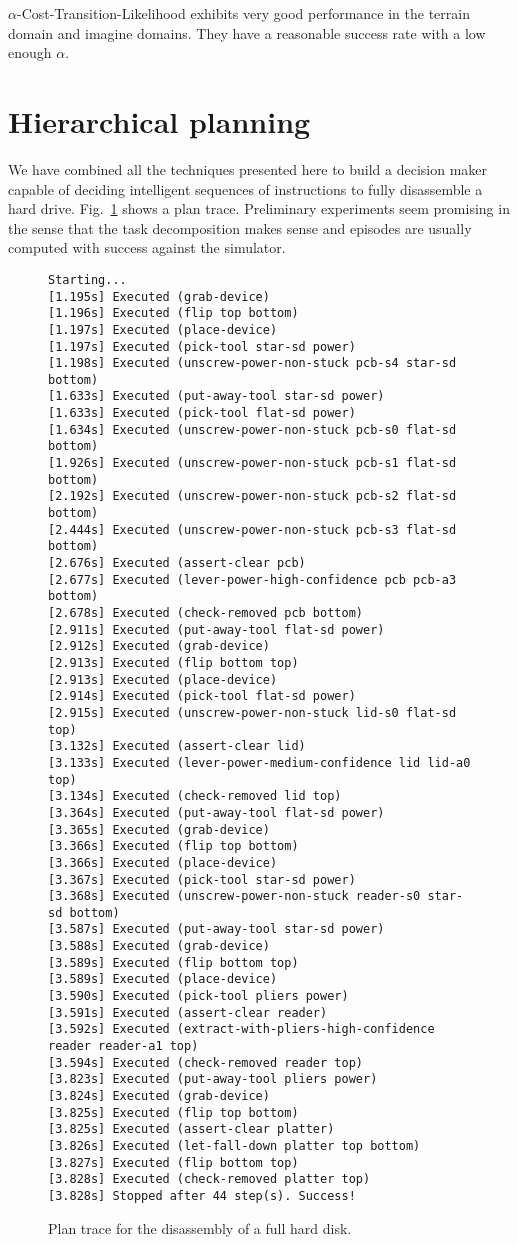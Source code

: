 \documentclass[../root.tex]{subfiles}
\begin{document}
$ \alpha $-Cost-Transition-Likelihood exhibits very good performance in the terrain domain
and imagine domains. They have a reasonable success rate with a low enough $ \alpha $.


\section{Hierarchical planning}

We have combined all the techniques presented here to build a decision
maker capable of deciding intelligent sequences of instructions to
fully disassemble a hard drive. Fig.~\ref{fig:full-drive-disassembly}
shows a plan trace. Preliminary experiments seem promising in the sense that
the task decomposition makes sense and episodes are usually computed with success
against the simulator.

\begin{figure}[tbhp]
\centering
\begin{lstlisting}[numbers=none]
Starting...
[1.195s] Executed (grab-device)
[1.196s] Executed (flip top bottom)
[1.197s] Executed (place-device)
[1.197s] Executed (pick-tool star-sd power)
[1.198s] Executed (unscrew-power-non-stuck pcb-s4 star-sd bottom)
[1.633s] Executed (put-away-tool star-sd power)
[1.633s] Executed (pick-tool flat-sd power)
[1.634s] Executed (unscrew-power-non-stuck pcb-s0 flat-sd bottom)
[1.926s] Executed (unscrew-power-non-stuck pcb-s1 flat-sd bottom)
[2.192s] Executed (unscrew-power-non-stuck pcb-s2 flat-sd bottom)
[2.444s] Executed (unscrew-power-non-stuck pcb-s3 flat-sd bottom)
[2.676s] Executed (assert-clear pcb)
[2.677s] Executed (lever-power-high-confidence pcb pcb-a3 bottom)
[2.678s] Executed (check-removed pcb bottom)
[2.911s] Executed (put-away-tool flat-sd power)
[2.912s] Executed (grab-device)
[2.913s] Executed (flip bottom top)
[2.913s] Executed (place-device)
[2.914s] Executed (pick-tool flat-sd power)
[2.915s] Executed (unscrew-power-non-stuck lid-s0 flat-sd top)
[3.132s] Executed (assert-clear lid)
[3.133s] Executed (lever-power-medium-confidence lid lid-a0 top)
[3.134s] Executed (check-removed lid top)
[3.364s] Executed (put-away-tool flat-sd power)
[3.365s] Executed (grab-device)
[3.366s] Executed (flip top bottom)
[3.366s] Executed (place-device)
[3.367s] Executed (pick-tool star-sd power)
[3.368s] Executed (unscrew-power-non-stuck reader-s0 star-sd bottom)
[3.587s] Executed (put-away-tool star-sd power)
[3.588s] Executed (grab-device)
[3.589s] Executed (flip bottom top)
[3.589s] Executed (place-device)
[3.590s] Executed (pick-tool pliers power)
[3.591s] Executed (assert-clear reader)
[3.592s] Executed (extract-with-pliers-high-confidence reader reader-a1 top)
[3.594s] Executed (check-removed reader top)
[3.823s] Executed (put-away-tool pliers power)
[3.824s] Executed (grab-device)
[3.825s] Executed (flip top bottom)
[3.825s] Executed (assert-clear platter)
[3.826s] Executed (let-fall-down platter top bottom)
[3.827s] Executed (flip bottom top)
[3.828s] Executed (check-removed platter top)
[3.828s] Stopped after 44 step(s). Success!
\end{lstlisting}
\caption{Plan trace for the disassembly of a full hard disk.}
\label{fig:full-drive-disassembly}
\end{figure}

\end{document}
